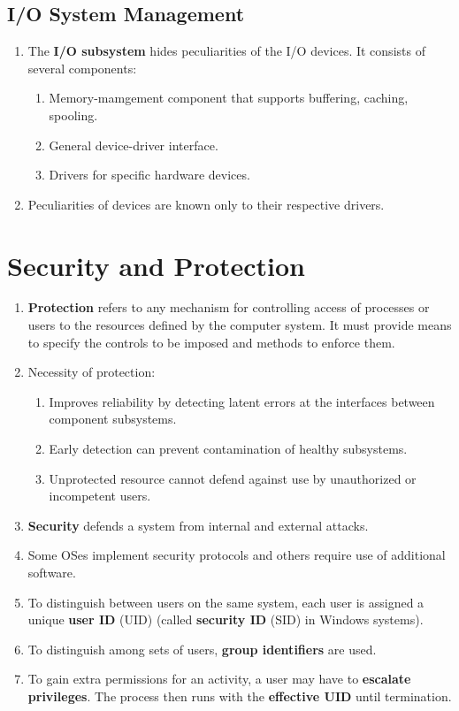 \documentclass[journal,12pt,twocolumn]{IEEEtran}
\begin{document}
\subsection{I/O System Management}
\begin{enumerate}
    \item The \textbf{I/O subsystem} hides peculiarities of the I/O devices. It 
    consists of several components:
    \begin{enumerate}
        \item Memory-mamgement component that supports buffering, caching, spooling.
        \item General device-driver interface.
        \item Drivers for specific hardware devices.
    \end{enumerate}
    \item Peculiarities of devices are known only to their respective drivers.
\end{enumerate}

\section{Security and Protection}

\begin{enumerate}
    \item \textbf{Protection} refers to any mechanism for controlling access 
    of processes or users to the resources defined by the computer system. It
    must provide means to specify the controls to be imposed and methods to 
    enforce them.
    \item Necessity of protection:
    \begin{enumerate}
        \item Improves reliability by detecting latent errors at the
        interfaces between component subsystems. 
        \item Early detection can prevent contamination of healthy subsystems. 
        \item Unprotected resource cannot defend against use by unauthorized 
        or incompetent users.
    \end{enumerate}
    \item \textbf{Security} defends a system from internal and external
    attacks.
    \item Some OSes implement security protocols and others require use of 
    additional software.
    \item To distinguish between users on the same system, each user is
    assigned a unique \textbf{user ID} (UID) (called \textbf{security ID} 
    (SID) in Windows systems).
    \item To distinguish among sets of users, \textbf{group identifiers}
    are used.
    \item To gain extra permissions for an activity, a user may have to 
    \textbf{escalate privileges}. The process then runs with the 
    \textbf{effective UID} until termination.
\end{enumerate}
\end{document}
